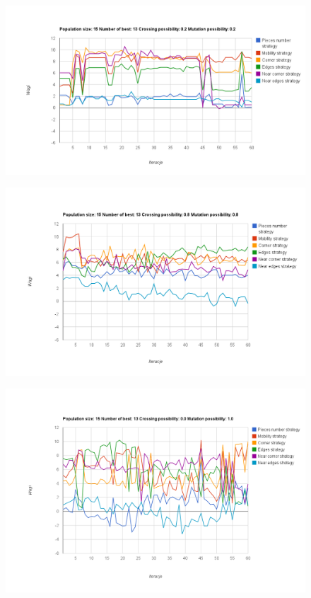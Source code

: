 \pagebreak

\begin{figure}[h!]
\centering
\includegraphics[width=\textwidth]{img/chart9.png}
\end{figure}

\begin{figure}[h!]
\centering
\includegraphics[width=\textwidth]{img/chart10.png}
\end{figure}

\pagebreak


\begin{figure}[h!]
\centering
\includegraphics[width=\textwidth]{img/chart15.png}
\end{figure}

